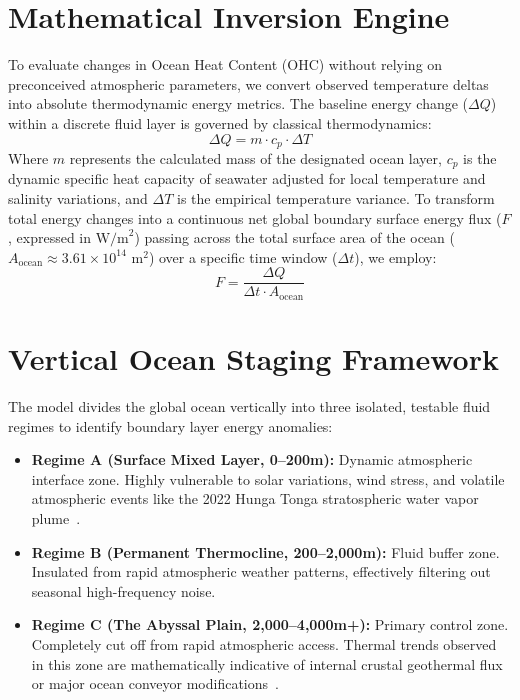 \documentclass[11pt,a4paper]{article}
\begin{document}
\section{Mathematical Inversion Engine}
To evaluate changes in Ocean Heat Content (OHC) without relying on preconceived atmospheric parameters, we convert observed temperature deltas into absolute thermodynamic energy metrics. The baseline energy change ($\Delta Q$) within a discrete fluid layer is governed by classical thermodynamics:
\begin{equation}
    \Delta Q = m \cdot c_p \cdot \Delta T
\end{equation}
Where $m$ represents the calculated mass of the designated ocean layer, $c_p$ is the dynamic specific heat capacity of seawater adjusted for local temperature and salinity variations, and $\Delta T$ is the empirical temperature variance. To transform total energy changes into a continuous net global boundary surface energy flux ($F$, expressed in $\text{W/m}^2$) passing across the total surface area of the ocean ($A_{\text{ocean}} \approx 3.61 \times 10^{14}\text{ m}^2$) over a specific time window ($\Delta t$), we employ:
\begin{equation}
    F = \frac{\Delta Q}{\Delta t \cdot A_{\text{ocean}}}
\end{equation}

\section{Vertical Ocean Staging Framework}
The model divides the global ocean vertically into three isolated, testable fluid regimes to identify boundary layer energy anomalies:
\begin{itemize}
    \item \textbf{Regime A (Surface Mixed Layer, 0--200m):} Dynamic atmospheric interface zone. Highly vulnerable to solar variations, wind stress, and volatile atmospheric events like the 2022 Hunga Tonga stratospheric water vapor plume~\cite{smithetal2024}.
    \item \textbf{Regime B (Permanent Thermocline, 200--2,000m):} Fluid buffer zone. Insulated from rapid atmospheric weather patterns, effectively filtering out seasonal high-frequency noise.
    \item \textbf{Regime C (The Abyssal Plain, 2,000--4,000m+):} Primary control zone. Completely cut off from rapid atmospheric access. Thermal trends observed in this zone are mathematically indicative of internal crustal geothermal flux or major ocean conveyor modifications~\cite{independent2025}.
\end{itemize}
\end{document}
